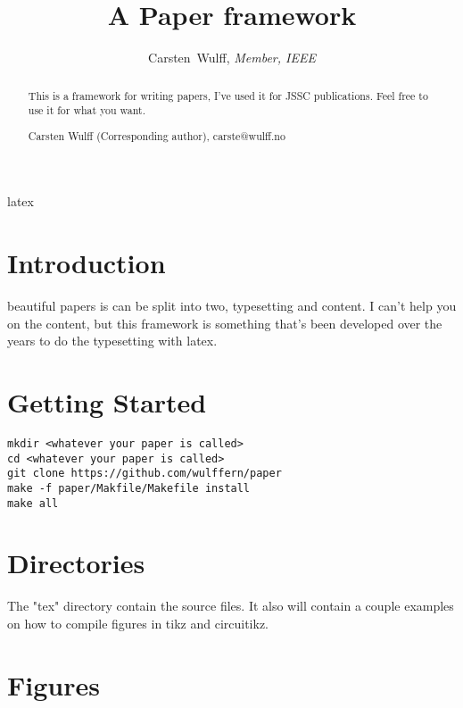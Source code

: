 





\title{A Paper framework}
%
\author{Carsten~Wulff, \textit{Member, IEEE} }

\maketitle

\begin{abstract}
This is a framework for writing papers, I've used it for JSSC publications. Feel free to use it for what you want.

Carsten Wulff (Corresponding author), carste@wulff.no

\end{abstract}
\begin{IEEEkeywords}
latex
\end{IEEEkeywords}

\section{Introduction} \label{introduction}


 beautiful papers is can be split into two, typesetting and content. I can't help you on the content, but this framework is something that's been developed over the years to do the typesetting with latex.

\section{Getting Started}

\begin{lstlisting}[frame=single,style=paperBashStyle]
mkdir <whatever your paper is called>
cd <whatever your paper is called>
git clone https://github.com/wulffern/paper
make -f paper/Makfile/Makefile install
make all
\end{lstlisting}

\section{Directories}

The "tex" directory contain the source files. It also will contain a couple examples on how to compile figures in tikz and circuitikz.


\section{Figures}

